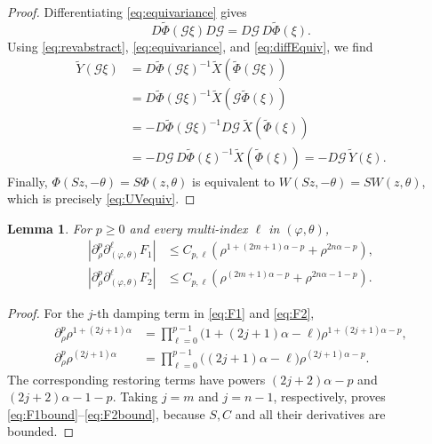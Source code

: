 \documentclass[11pt]{amsart}
\newtheorem{lemma}[theorem]{Lemma}
\theoremstyle{remark}
\begin{document}
\begin{proof}
Differentiating \eqref{eq:equivariance} gives
\begin{equation}\label{eq:diffEquiv}
 D\widetilde\Phi(\mathscr G\xi)D\mathscr G
 =D\mathscr G\,D\widetilde\Phi(\xi).
\end{equation}
Using \eqref{eq:revabstract}, \eqref{eq:equivariance}, and
\eqref{eq:diffEquiv}, we find
\begin{align*}
 \widetilde Y(\mathscr G\xi)
 &=
 D\widetilde\Phi(\mathscr G\xi)^{-1}
 \widetilde X(\widetilde\Phi(\mathscr G\xi))\\
 &=
 D\widetilde\Phi(\mathscr G\xi)^{-1}
 \widetilde X(\mathscr G\widetilde\Phi(\xi))\\
 &=
 -D\widetilde\Phi(\mathscr G\xi)^{-1}
 D\mathscr G\,\widetilde X(\widetilde\Phi(\xi))\\
 &=-D\mathscr G\,D\widetilde\Phi(\xi)^{-1}
 \widetilde X(\widetilde\Phi(\xi))
 =-D\mathscr G\,\widetilde Y(\xi).
\end{align*}
Finally, $\Phi(Sz,-\theta)=S\Phi(z,\theta)$ is equivalent to
$W(Sz,-\theta)=SW(z,\theta)$, which is precisely
\eqref{eq:UVequiv}.
\end{proof}

\begin{lemma}\label{lem:symbol}
For $p\geq0$ and every multi-index $\ell$ in $(\varphi,\theta)$,
\begin{align}
 |\partial_\rho^p\partial_{(\varphi,\theta)}^\ell F_1|
 &\leq C_{p,\ell}
 \left(\rho^{1+(2m+1)\alpha-p}+\rho^{2n\alpha-p}\right),
 \label{eq:F1bound}\\
 |\partial_\rho^p\partial_{(\varphi,\theta)}^\ell F_2|
 &\leq C_{p,\ell}
 \left(\rho^{(2m+1)\alpha-p}+
       \rho^{2n\alpha-1-p}\right).
 \label{eq:F2bound}
\end{align}
\end{lemma}

\begin{proof}
For the $j$-th damping term in \eqref{eq:F1} and \eqref{eq:F2},
\begin{align*}
 \partial_\rho^p
 \rho^{1+(2j+1)\alpha}
 &=\prod_{\ell=0}^{p-1}
 \bigl(1+(2j+1)\alpha-\ell\bigr)
 \rho^{1+(2j+1)\alpha-p},\\
 \partial_\rho^p
 \rho^{(2j+1)\alpha}
 &=\prod_{\ell=0}^{p-1}
 \bigl((2j+1)\alpha-\ell\bigr)
 \rho^{(2j+1)\alpha-p}.
\end{align*}
The corresponding restoring terms have powers
$(2j+2)\alpha-p$ and $(2j+2)\alpha-1-p$.
Taking $j=m$ and $j=n-1$, respectively, proves
\eqref{eq:F1bound}--\eqref{eq:F2bound}, because $S,C$ and all their
derivatives are bounded.
\end{proof}
\end{document}
